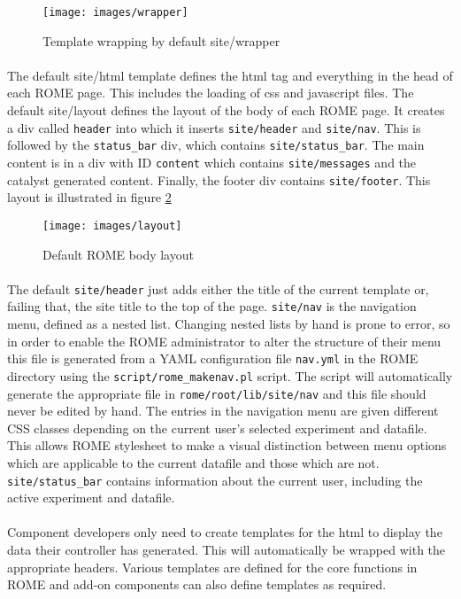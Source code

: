 \begin{figure}
\centering
\caption{Template wrapping by default site/wrapper}\label{fig:wrapper}
\texttt{[image: images/wrapper]}
\end{figure}

\paragraph{}
The default site/html template defines the html tag and everything in the head of each ROME page. This includes the loading of css and javascript files.
The default site/layout defines the layout of the body of each ROME page. It creates a div called \texttt{header} into which it inserts \texttt{site/header} and \texttt{site/nav}. This is followed by the \texttt{status\_bar} div, which contains \texttt{site/status\_bar}. The main content is in a div with ID \texttt{content} which contains \texttt{site/messages} and the catalyst generated content. Finally, the footer div contains \texttt{site/footer}. This layout is illustrated in figure \ref{fig:layout}

\begin{figure}
\centering
\caption{Default ROME body layout}\label{fig:layout}
\texttt{[image: images/layout]}
\end{figure}

\paragraph{}
The default \texttt{site/header} just adds either the title of the current template or, failing that, the site title to the top of the page. \texttt{site/nav} is the navigation menu, defined as a nested list. Changing nested lists by hand is prone to error, so in order to enable the ROME administrator to alter the structure of their menu this file is generated from a YAML configuration file \texttt{nav.yml} in the ROME directory using the \texttt{script/rome\_makenav.pl} script. The script will automatically generate the appropriate file in \texttt{rome/root/lib/site/nav} and this file should never be edited by hand. The entries in the navigation menu are given different CSS classes depending on the current user's selected experiment and datafile. This allows ROME stylesheet to make a visual distinction between menu options which are applicable to the current datafile and those which are not. \texttt{site/status\_bar} contains information about the current user, including the active experiment and datafile.

\paragraph{} 
Component developers only need to create templates for the html to display the data their controller has generated. This will automatically be wrapped with the appropriate headers. Various templates are defined for the core functions in ROME and add-on components can also define templates as required. 
